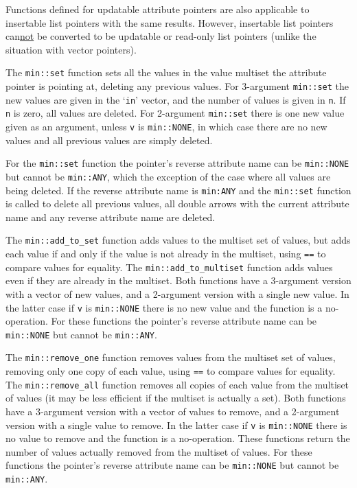 \documentclass[12pt]{article}
\newcommand{\EOL}{\penalty \exhyphenpenalty}
\begin{document}
Functions defined for updatable attribute pointers are also
applicable to insertable list pointers with the
same results.  However, insertable list pointers
can\underline{not} be converted to be updatable or read-only list pointers
(unlike the situation with vector pointers).

The {\tt min::\EOL set}
function sets all the values in the value multiset the
attribute pointer is pointing at, deleting any previous values.
For 3-argument {\tt min::\EOL set}
the new values are given in the `{\tt in}' vector, and
the number of values is given in {\tt n}.  If {\tt n} is zero, all
values are deleted.
For 2-argument {\tt min::\EOL set} there is one new value given as an
argument, unless {\tt v} is \verb|min::NONE|,
in which case there are no new values and all previous values are simply
deleted.

For the {\tt min::\EOL set} function the
pointer's reverse attribute name can be \verb|min::NONE|
but cannot be \verb|min::ANY|, which the exception of the case
where all values are being deleted.  If the reverse attribute name
is \verb|min:ANY| and the {\tt min::\EOL set} function is called to
delete all previous values,
all double arrows with the current attribute name and any
reverse attribute name are deleted.

The {\tt min::\EOL add\_\EOL to\_\EOL set} function
adds values to the multiset set of values,
but adds each value if and only if the value is not already in the multiset,
using {\tt ==} to compare values for equality.
The {\tt min::\EOL add\_\EOL to\_\EOL multiset} function
adds values even if they are already in the multiset.
Both functions have a 3-argument version with a vector of new values,
and a 2-argument version with a single new value.  In the latter case
if {\tt v} is \verb|min::NONE| there is no new value and the function
is a no-operation.
For these functions the pointer's reverse attribute name
can be \verb|min::NONE|
but cannot be \verb|min::ANY|.

The {\tt min::\EOL remove\_\EOL one} function
removes values from the multiset set of values, removing only one copy of
each value,
using {\tt ==} to compare values for equality.
The {\tt min::\EOL remove\_\EOL all} function
removes all copies of each value  
from the multiset of values (it may be less efficient if
the multiset is actually a set).
Both functions have a 3-argument version with a vector of values to remove,
and a 2-argument version with a single value to remove.  In the latter case
if {\tt v} is \verb|min::NONE| there is no value to remove and the function
is a no-operation.  These functions return the number of values actually
removed from the multiset of values.
For these functions the pointer's reverse attribute name
can be \verb|min::NONE| but cannot be \verb|min::ANY|.
\end{document}
